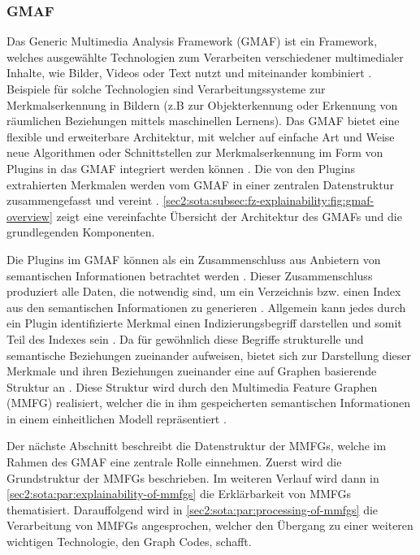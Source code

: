 \subsubsection{GMAF}
\label{sec2:sota:subsubsec:gmaf}
Das Generic Multimedia Analysis Framework (GMAF) \cite{gmaf_github} ist ein Framework, welches ausgewählte Technologien zum Verarbeiten verschiedener multimedialer Inhalte, wie Bilder, Videos oder Text nutzt und miteinander kombiniert \cite{ai-based-sem-ind-retr-soc, exp-mmfg}.
Beispiele für solche Technologien sind Verarbeitungssysteme zur Merkmalserkennung in Bildern (z.B zur Objekterkennung oder Erkennung von räumlichen Beziehungen mittels maschinellen Lernens).
Das GMAF bietet eine flexible und erweiterbare Architektur, mit welcher auf einfache Art und Weise neue Algorithmen oder Schnittstellen zur Merkmalserkennung im Form von Plugins in das GMAF integriert werden können \cite{exp-mmfg}.
Die von den Plugins extrahierten Merkmalen werden vom GMAF in einer zentralen Datenstruktur zusammengefasst und vereint \cite{ai-based-sem-ind-retr-soc, jour-smmir}. \cref{sec2:sota:subsec:fz-explainability:fig:gmaf-overview} zeigt eine vereinfachte Übersicht der Architektur des GMAFs und die grundlegenden Komponenten.

Die Plugins im GMAF können als ein Zusammenschluss aus Anbietern von semantischen Informationen betrachtet werden \cite{ai-based-sem-ind-retr-soc}.
Dieser Zusammenschluss produziert alle Daten, die notwendig sind, um ein Verzeichnis bzw. einen Index aus den semantischen Informationen zu generieren \cite{ai-based-sem-ind-retr-soc}.
Allgemein kann jedes durch ein Plugin identifizierte Merkmal einen Indizierungsbegriff darstellen und somit Teil des Indexes sein \cite{fast-effec-retr-large-collec}.
Da für gewöhnlich diese Begriffe strukturelle und semantische Beziehungen zueinander aufweisen, bietet sich zur Darstellung dieser Merkmale und ihren Beziehungen zueinander eine auf Graphen basierende Struktur an \cite{fast-effec-retr-large-collec}.
Diese Struktur wird durch den Multimedia Feature Graphen (MMFG) realisiert, welcher die in ihm gespeicherten semantischen Informationen in einem einheitlichen Modell repräsentiert \cite{fast-effec-retr-large-collec}.

Der nächste Abschnitt beschreibt die Datenstruktur der MMFGs, welche im Rahmen des GMAF eine zentrale Rolle einnehmen.
Zuerst wird die Grundstruktur der MMFGs beschrieben.
Im weiteren Verlauf wird dann in \cref{sec2:sota:par:explainability-of-mmfgs} die Erklärbarkeit von MMFGs thematisiert.
Darauffolgend wird in \cref{sec2:sota:par:processing-of-mmfgs} die Verarbeitung von MMFGs angesprochen, welcher den Übergang zu einer weiteren wichtigen Technologie, den Graph Codes, schafft.

